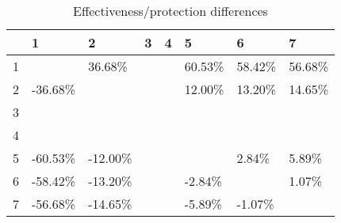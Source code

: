 \begin{table}[ht]
\centering
\begin{tabular}{rlllllll}
  \hline
 & 1 & 2 & 3 & 4 & 5 & 6 & 7 \\ 
  \hline
1 &  & 36.68\% &  &  & 60.53\% & 58.42\% & 56.68\% \\ 
  2 & -36.68\% &  &  &  & 12.00\% & 13.20\% & 14.65\% \\ 
  3 &  &  &  &  &  &  &  \\ 
  4 &  &  &  &  &  &  &  \\ 
  5 & -60.53\% & -12.00\% &  &  &  & 2.84\% & 5.89\% \\ 
  6 & -58.42\% & -13.20\% &  &  & -2.84\% &  & 1.07\% \\ 
  7 & -56.68\% & -14.65\% &  &  & -5.89\% & -1.07\% &  \\ 
   \hline
\end{tabular}
\caption{Effectiveness/protection differences} 
\end{table}
